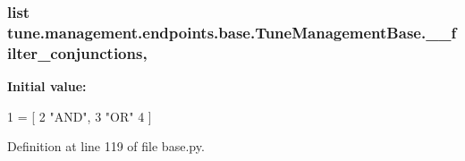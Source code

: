 \hypertarget{classtune_1_1management_1_1endpoints_1_1base_1_1TuneManagementBase_a7478579ae48607ab70b989f75e3a84ce}{
\subsubsection[{\-\_\-\-\_\-filter\-\_\-conjunctions}]{\setlength{\rightskip}{0pt plus 5cm}list tune.\-management.\-endpoints.\-base.\-Tune\-Management\-Base.\-\_\-\-\_\-filter\-\_\-conjunctions\hspace{0.3cm}{\ttfamily [static]}, {\ttfamily [private]}}}\label{classtune_1_1management_1_1endpoints_1_1base_1_1TuneManagementBase_a7478579ae48607ab70b989f75e3a84ce}
{\bfseries Initial value\-:}
\begin{DoxyCode}
1 = [
2         \textcolor{stringliteral}{"AND"},
3         \textcolor{stringliteral}{"OR"}
4         ]
\end{DoxyCode}


Definition at line 119 of file base.\-py.


